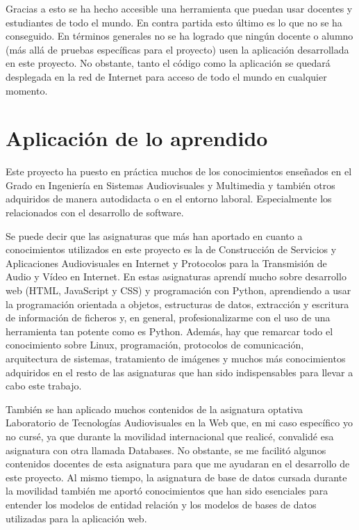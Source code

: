 \documentclass[a4paper, 12pt]{book}
\begin{document}
Gracias a esto se ha hecho accesible una herramienta que puedan usar docentes y estudiantes de todo el mundo. En contra partida esto último es lo que no se ha conseguido. En términos generales no se ha logrado que ningún docente o alumno (más allá de pruebas específicas para el proyecto) usen la aplicación desarrollada en este proyecto. No obstante, tanto el código como la aplicación se quedará desplegada en la red de Internet para acceso de todo el mundo en cualquier momento. 


\section{Aplicación de lo aprendido}
\label{sec:aplicacion}

Este proyecto ha puesto en práctica muchos de los conocimientos enseñados en el Grado en Ingeniería en Sistemas Audiovisuales y Multimedia y también otros adquiridos de manera autodidacta o en el entorno laboral. Especialmente los relacionados con el desarrollo de software.

Se puede decir que las asignaturas que más han aportado en cuanto a conocimientos utilizados en este proyecto es la de Construcción de Servicios y Aplicaciones Audiovisuales en Internet y Protocolos para la Transmisión de Audio y Vídeo en Internet. En estas asignaturas aprendí mucho sobre desarrollo web (HTML, JavaScript y CSS) y programación con Python, aprendiendo a usar la programación orientada a objetos, estructuras de datos, extracción y escritura de información de ficheros y, en general, profesionalizarme con el uso de una herramienta tan potente como es Python. Además, hay que remarcar todo el conocimiento sobre Linux, programación, protocolos de comunicación, arquitectura de sistemas, tratamiento de imágenes y muchos más conocimientos adquiridos en el resto de las asignaturas que han sido indispensables para llevar a cabo este trabajo.

También se han aplicado muchos contenidos de la asignatura optativa Laboratorio de Tecnologías Audiovisuales en la Web que, en mi caso específico yo no cursé, ya que durante la movilidad internacional que realicé, convalidé esa asignatura con otra llamada Databases. No obstante, se me facilitó algunos contenidos docentes de esta asignatura para que me ayudaran en el desarrollo de este proyecto. Al mismo tiempo, la asignatura de base de datos cursada durante la movilidad también me aportó conocimientos que han sido esenciales para entender los modelos de entidad relación y los modelos de bases de datos utilizadas para la aplicación web.
\end{document}
